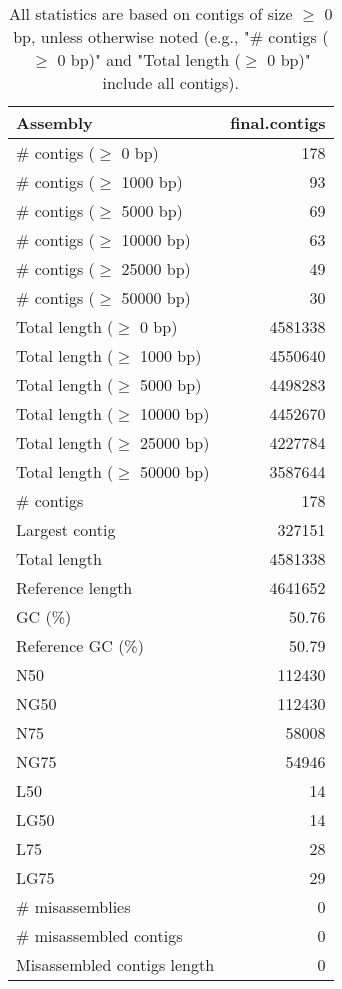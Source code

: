\documentclass[12pt,a4paper]{article}
\begin{document}
\begin{table}[ht]
\begin{center}
\caption{All statistics are based on contigs of size $\geq$ 0 bp, unless otherwise noted (e.g., "\# contigs ($\geq$ 0 bp)" and "Total length ($\geq$ 0 bp)" include all contigs).}
\begin{tabular}{|l*{1}{|r}|}
\hline
Assembly & final.contigs \\ \hline
\# contigs ($\geq$ 0 bp) & 178 \\ \hline
\# contigs ($\geq$ 1000 bp) & 93 \\ \hline
\# contigs ($\geq$ 5000 bp) & 69 \\ \hline
\# contigs ($\geq$ 10000 bp) & 63 \\ \hline
\# contigs ($\geq$ 25000 bp) & 49 \\ \hline
\# contigs ($\geq$ 50000 bp) & 30 \\ \hline
Total length ($\geq$ 0 bp) & 4581338 \\ \hline
Total length ($\geq$ 1000 bp) & 4550640 \\ \hline
Total length ($\geq$ 5000 bp) & 4498283 \\ \hline
Total length ($\geq$ 10000 bp) & 4452670 \\ \hline
Total length ($\geq$ 25000 bp) & 4227784 \\ \hline
Total length ($\geq$ 50000 bp) & 3587644 \\ \hline
\# contigs & 178 \\ \hline
Largest contig & 327151 \\ \hline
Total length & 4581338 \\ \hline
Reference length & 4641652 \\ \hline
GC (\%) & 50.76 \\ \hline
Reference GC (\%) & 50.79 \\ \hline
N50 & 112430 \\ \hline
NG50 & 112430 \\ \hline
N75 & 58008 \\ \hline
NG75 & 54946 \\ \hline
L50 & 14 \\ \hline
LG50 & 14 \\ \hline
L75 & 28 \\ \hline
LG75 & 29 \\ \hline
\# misassemblies & 0 \\ \hline
\# misassembled contigs & 0 \\ \hline
Misassembled contigs length & 0 \\ \hline

\end{tabular}
\end{center}
\end{table}
\end{document}
